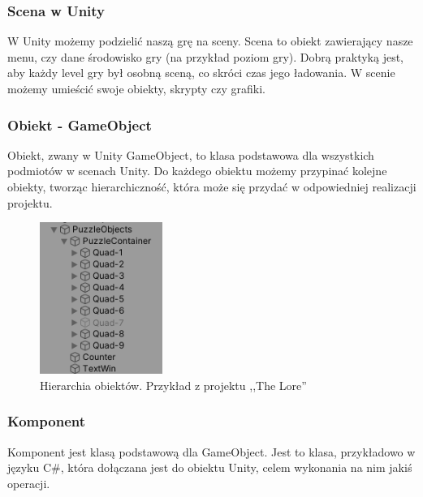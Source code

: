 \documentclass[oneside,polski,logo]{amuthesis}
\begin{document}
\subsubsection{Scena w Unity}
\par W Unity możemy podzielić naszą grę na sceny. Scena to obiekt zawierający nasze menu, czy dane środowisko gry (na przykład poziom gry). Dobrą praktyką jest, aby każdy level gry był osobną sceną, co skróci czas jego ładowania. W scenie możemy umieścić swoje obiekty, skrypty czy grafiki. \cite{scena}
\subsubsection{Obiekt - GameObject}
\label{sec:gameobject}
\par Obiekt, zwany w Unity GameObject, to klasa podstawowa dla wszystkich podmiotów w scenach Unity. Do każdego obiektu możemy przypinać kolejne obiekty, tworząc hierarchiczność, która może się przydać w odpowiedniej realizacji projektu. \cite{gameobject}
\begin{figure}[h]
	\centering
	\includegraphics[width=4cm]{images/tyrek/hierarchia.png}
	\caption{Hierarchia obiektów. Przykład z projektu ,,The Lore''}
\end{figure}
\subsubsection{Komponent}
\label{sec:komponent}
\par Komponent jest klasą podstawową dla GameObject. Jest to klasa, przykładowo w języku C\#, która dołączana jest do obiektu Unity, celem wykonania na nim jakiś operacji. \cite{komponent}
\end{document}
